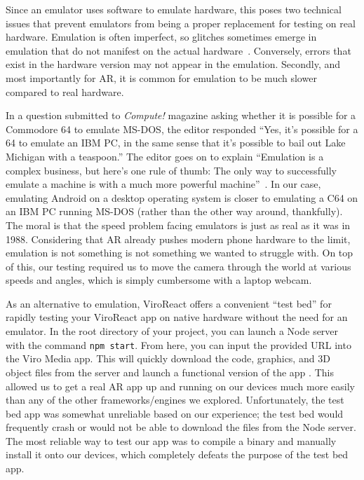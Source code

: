 \documentclass[a4paper, 10pt, american, titlepage]{article}
\begin{document}
Since an emulator uses software to emulate hardware, this poses two technical
issues that prevent emulators from being a proper replacement for testing on
real hardware. Emulation is often imperfect, so glitches sometimes emerge in
emulation that do not manifest on the actual hardware~\autocite{alzaylaee2017}.
Conversely, errors that exist in the hardware version may not appear in the
emulation. Secondly, and most importantly for AR, it is common for emulation to
be much slower compared to real hardware.

In a question submitted to \textit{Compute!} magazine asking whether it is
possible for a Commodore 64 to emulate MS-DOS, the editor responded ``Yes, it's
possible for a 64 to emulate an IBM PC, in the same sense that it's possible to
bail out Lake Michigan with a teaspoon.'' The editor goes on to explain
``Emulation is a complex business, but here's one rule of thumb: The only way to
successfully emulate a machine is with a much more powerful
machine''~\autocite{warick1988}. In our case, emulating Android on a desktop
operating system is closer to emulating a C64 on an IBM PC running MS-DOS
(rather than the other way around, thankfully). The moral is that the speed
problem facing emulators is just as real as it was in 1988. Considering that AR
already pushes modern phone hardware to the limit, emulation is not something is
not something we wanted to struggle with. On top of this, our testing required
us to move the camera through the world at various speeds and angles, which is
simply cumbersome with a laptop webcam.

As an alternative to emulation, ViroReact offers a convenient ``test bed'' for
rapidly testing your ViroReact app on native hardware without the need for an
emulator. In the root directory of your project, you can launch a Node server
with the command \texttt{npm start}. From here, you can input the provided URL
into the Viro Media app. This will quickly download the code, graphics, and 3D
object files from the server and launch a functional version of the app
\autocite{viro-testbed2019}. This allowed us to get a real AR app up and
running on our devices much more easily than any of the other
frameworks/engines we explored. Unfortunately, the test bed app was somewhat
unreliable based on our experience; the test bed would frequently crash or
would not be able to download the files from the Node server. The most reliable
way to test our app was to compile a binary and manually install it onto our
devices, which completely defeats the purpose of the test bed app.
\end{document}
